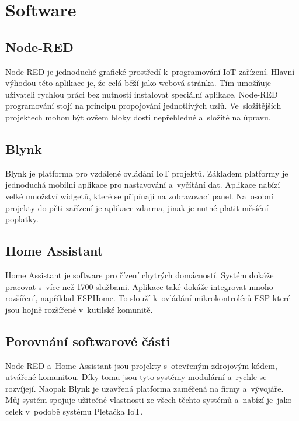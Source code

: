 \newpage

\section{Software}


\subsection{Node-RED}
Node-RED je jednoduché grafické prostředí k~programování IoT zařízení. 
Hlavní výhodou této aplikace je, že celá běží jako webová stránka. 
Tím umožňuje uživateli rychlou práci bez nutnosti instalovat speciální aplikace.
Node-RED programování stojí na principu propojování jednotlivých uzlů.
Ve~složitějších projektech mohou být ovšem bloky dosti nepřehledné a~složité na úpravu.


\subsection{Blynk}
Blynk je platforma pro vzdálené ovládání IoT projektů.
Základem platformy je jednoduchá mobilní aplikace pro nastavování a~vyčítání dat.
Aplikace nabízí velké množství widgetů, které se připínají na zobrazovací panel.
Na~osobní projekty do pěti zařízení je aplikace zdarma, jinak je nutné platit měsíční poplatky.


\subsection{Home Assistant}
Home Assistant je software pro řízení chytrých domácností. 
Systém dokáže pracovat s~více než 1700 službami.
Aplikace také dokáže integrovat mnoho rozšíření, například ESPHome.
To slouží k~ovládání mikrokontrolérů ESP které jsou hojně rozšířené v~kutilské komunitě.


\subsection{Porovnání softwarové části}
Node-RED a~Home Assistant jsou projekty s~otevřeným zdrojovým kódem, utvářené komunitou.
Díky tomu jsou tyto systémy modulární a~rychle se rozvíjejí. %
Naopak Blynk je uzavřená platforma zaměřená na firmy a~vývojáře.
Můj systém spojuje užitečné vlastnosti ze všech těchto systémů a~nabízí je~jako celek v~podobě systému Pletačka IoT.
